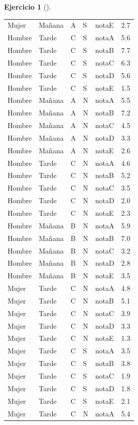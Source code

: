 \documentclass[
  a4paper,
]{scrreport}
\theoremstyle{definition}
\newtheorem{exercise}{Ejercicio}[chapter]
\theoremstyle{remark}
\begin{document}
\begin{exercise}[]
\begin{enumerate}
\begin{tcolorbox}
\begin{longtable}[]{@{}lllllr@{}}
  Mujer & Mañana & A & S & notaE & 2.7 \\
  Hombre & Tarde & C & S & notaA & 5.6 \\
  Hombre & Tarde & C & S & notaB & 7.7 \\
  Hombre & Tarde & C & S & notaC & 6.3 \\
  Hombre & Tarde & C & S & notaD & 5.6 \\
  Hombre & Tarde & C & S & notaE & 1.5 \\
  Hombre & Mañana & A & N & notaA & 5.5 \\
  Hombre & Mañana & A & N & notaB & 7.2 \\
  Hombre & Mañana & A & N & notaC & 4.5 \\
  Hombre & Mañana & A & N & notaD & 3.3 \\
  Hombre & Mañana & A & N & notaE & 2.6 \\
  Hombre & Tarde & C & N & notaA & 4.6 \\
  Hombre & Tarde & C & N & notaB & 5.2 \\
  Hombre & Tarde & C & N & notaC & 3.5 \\
  Hombre & Tarde & C & N & notaD & 2.0 \\
  Hombre & Tarde & C & N & notaE & 2.3 \\
  Hombre & Mañana & B & N & notaA & 5.9 \\
  Hombre & Mañana & B & N & notaB & 7.0 \\
  Hombre & Mañana & B & N & notaC & 3.2 \\
  Hombre & Mañana & B & N & notaD & 2.8 \\
  Hombre & Mañana & B & N & notaE & 3.5 \\
  Mujer & Tarde & C & N & notaA & 4.8 \\
  Mujer & Tarde & C & N & notaB & 5.1 \\
  Mujer & Tarde & C & N & notaC & 3.9 \\
  Mujer & Tarde & C & N & notaD & 3.3 \\
  Mujer & Tarde & C & N & notaE & 1.3 \\
  Mujer & Tarde & C & S & notaA & 3.5 \\
  Mujer & Tarde & C & S & notaB & 3.8 \\
  Mujer & Tarde & C & S & notaC & 1.9 \\
  Mujer & Tarde & C & S & notaD & 1.8 \\
  Mujer & Tarde & C & S & notaE & 2.1 \\
  Mujer & Tarde & C & N & notaA & 5.4 \\

\end{longtable}
\end{tcolorbox}
\end{enumerate}
\end{exercise}
\end{document}
